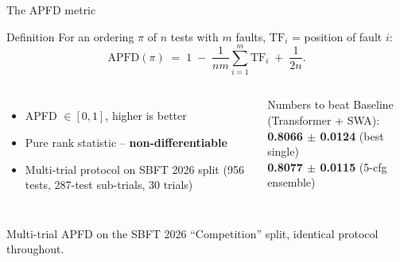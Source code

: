 \documentclass[aspectratio=169,10pt]{beamer}
\begin{document}
\begin{frame}{The APFD metric}
\begin{block}{Definition}
For an ordering $\pi$ of $n$ tests with $m$ faults, $\mathrm{TF}_i$ = position of fault $i$:
\[
  \mathrm{APFD}(\pi) \;=\; 1 \;-\; \frac{1}{nm}\sum_{i=1}^{m} \mathrm{TF}_i \;+\; \frac{1}{2n}.
\]
\end{block}

\begin{columns}[T]
\begin{itemize}\small
  \item APFD $\in [0, 1]$, higher is better
  \item Pure rank statistic -- \textbf{non-differentiable}
  \item Multi-trial protocol on SBFT 2026 split (956 tests, 287-test sub-trials, 30 trials)
\end{itemize}

\begin{exampleblock}{Numbers to beat}
\footnotesize
Baseline (Transformer + SWA): \\
\quad \textbf{0.8066 $\pm$ 0.0124} (best single)\\
\quad \textbf{0.8077 $\pm$ 0.0115} (5-cfg ensemble)
\end{exampleblock}
\end{columns}

\centering\footnotesize
Multi-trial APFD on the SBFT 2026 ``Competition'' split, identical protocol throughout.
\end{frame}
\end{document}

